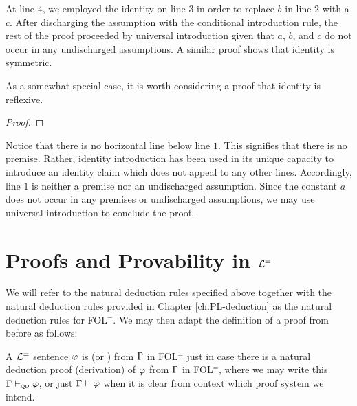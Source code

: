At line $4$, we employed the identity on line $3$ in order to replace $b$ in line $2$ with a $c$.
After discharging the assumption with the conditional introduction rule, the rest of the proof proceeded by universal introduction given that $a$, $b$, and $c$ do not occur in any undischarged assumptions. 
A similar proof shows that identity is symmetric.

As a somewhat special case, it is worth considering a proof that identity is reflexive.

\begin{proof}
    
   
\end{proof}

Notice that there is no horizontal line below line $1$.
This signifies that there is no premise.
Rather, identity introduction has been used in its unique capacity to introduce an identity claim which does not appeal to any other lines.
Accordingly, line $1$ is neither a premise nor an undischarged assumption.
Since the constant $a$ does not occur in any premises or undischarged assumptions, we may use universal introduction to conclude the proof.




\section{Proofs and Provability in $\mathcal{L}^{=}$}

We will refer to the natural deduction rules specified above together with the natural deduction rules provided in Chapter \ref{ch.PL-deduction} as the natural deduction rules for FOL$^=$.
We may then adapt the definition of a proof from before as follows:


A $\mathcal{L}^{=}$ sentence $\varphi$ is  (or ) from $\Gamma$ in FOL$^=$ just in case there is a natural deduction proof (derivation) of $\varphi$ from $\Gamma$ in FOL$^=$, where we may write this $\Gamma \vdash_{\textsc{qd}} \varphi$, or just $\Gamma \vdash \varphi$ when it is clear from context which proof system we intend. 

